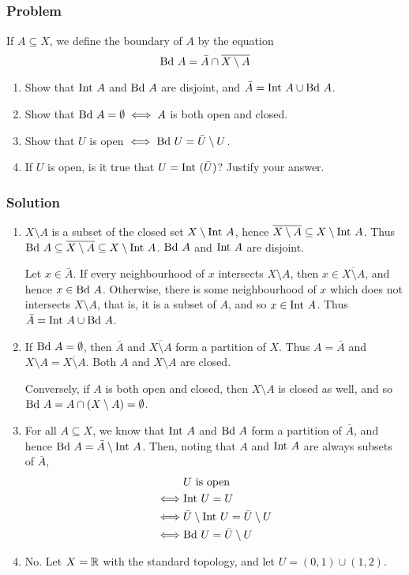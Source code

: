 \setcounter{subsection}{18} %
\subsection{}
\subsubsection{Problem}
If $A \subseteq X$, we define the boundary of $A$ by the equation
\[\mathrm{Bd\ } A = \bar A \cap \overline{X \setminus A}\]
\begin{enumerate}
\item Show that $\mathrm{Int\ } A$ and $\mathrm{Bd\ } A$ are disjoint, and $\bar A = \mathrm{Int\ } A \cup \mathrm{Bd\ } A$.
\item Show that $\mathrm{Bd\ } A = \emptyset \iff A$ is both open and closed.
\item Show that $U$ is open $\iff \mathrm{Bd\ } U = \bar U \setminus U$.
\item If $U$ is open, is it true that $U = \mathrm{Int\ }(\bar U)$? Justify your answer.
\end{enumerate}

\subsubsection{Solution}
\begin{enumerate}
\item $X \setminus A$ is a subset of the closed set $X \setminus \mathrm{Int\ } A$, hence $\overline{X \setminus A} \subseteq X \setminus \mathrm{Int\ } A$. Thus $\mathrm{Bd\ } A \subseteq \overline{X \setminus A} \subseteq X \setminus \mathrm{Int\ } A$. $\mathrm{Bd\ } A$ and $\mathrm{Int\ } A$ are disjoint.

Let $x \in \bar A$. If every neighbourhood of $x$ intersects $X \setminus A$, then $x \in \overline{X \setminus A}$, and hence $x \in \mathrm{Bd\ } A$. Otherwise, there is some neighbourhood of $x$ which does not intersects $X \setminus A$, that is, it is a subset of $A$, and so $x \in \mathrm{Int\ } A$. Thus $\bar A = \mathrm{Int\ } A \cup \mathrm{Bd\ } A$.

\item If $\mathrm{Bd\ } A = \emptyset$, then $\bar A$ and $\overline{X \setminus A}$ form a partition of $X$. Thus $A = \bar A$ and $X \setminus A = \overline{X \setminus A}$. Both $A$ and $X \setminus A$ are closed.

Conversely, if $A$ is both open and closed, then $X \setminus A$ is closed as well, and so $\mathrm{Bd\ } A = A \cap (X \setminus A) = \emptyset$.

\item For all $A \subseteq X$, we know that $\mathrm{Int\ } A$ and $\mathrm{Bd\ } A$ form a partition of $\bar A$, and hence $\mathrm{Bd\ } A = \bar A \setminus \mathrm{Int\ } A$. Then, noting that $A$ and $\mathrm{Int\ } A$ are always subsets of $\bar A$,
\begin{align*}
& U \textrm{ is open} \\
\iff& \mathrm{Int\ } U = U \\
\iff& \bar U \setminus \mathrm{Int\ } U = \bar U \setminus U \\
\iff& \mathrm{Bd\ } U = \bar U \setminus U
\end{align*}

\item No. Let $X = \mathbb R$ with the standard topology, and let $U = (0,1) \cup (1,2)$.
\end{enumerate}

